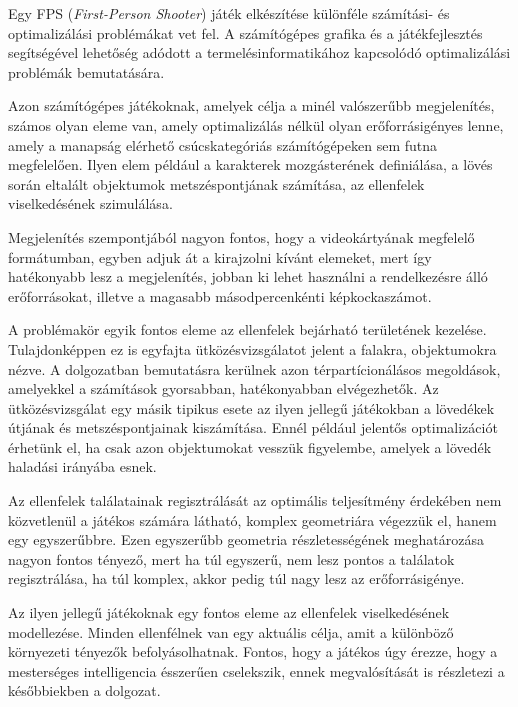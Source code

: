 \label{Chap:bevezetes}

Egy FPS (\textit{First-Person Shooter}) játék elkészítése különféle számítási- és optimalizálási problémákat vet fel. A számítógépes grafika és a játékfejlesztés segítségével lehetőség adódott a termelésinformatikához kapcsolódó optimalizálási problémák bemutatására.

Azon számítógépes játékoknak, amelyek célja a minél valószerűbb megjelenítés, számos olyan eleme van, amely optimalizálás nélkül olyan erőforrásigényes lenne, amely a manapság elérhető csúcskategóriás számítógépeken sem futna megfelelően. Ilyen elem például a karakterek mozgásterének definiálása, a lövés során eltalált objektumok metszéspontjának számítása, az ellenfelek viselkedésének szimulálása.

Megjelenítés szempontjából nagyon fontos, hogy a videokártyának megfelelő formátumban, egyben adjuk át a kirajzolni kívánt elemeket, mert így hatékonyabb lesz a megjelenítés, jobban ki lehet használni a rendelkezésre álló erőforrásokat, illetve a magasabb másodpercenkénti képkockaszámot.

A problémakör egyik fontos eleme az ellenfelek bejárható területének kezelése. Tulajdonképpen ez is egyfajta ütközésvizsgálatot jelent a falakra, objektumokra nézve. A dolgozatban bemutatásra kerülnek azon térpartícionálásos megoldások, amelyekkel a számítások gyorsabban, hatékonyabban elvégezhetők. Az ütközésvizsgálat egy másik tipikus esete az ilyen jellegű játékokban a lövedékek útjának és metszéspontjainak kiszámítása. Ennél például jelentős optimalizációt érhetünk el, ha csak azon objektumokat vesszük figyelembe, amelyek a lövedék haladási irányába esnek.

Az ellenfelek találatainak regisztrálását az optimális teljesítmény érdekében nem közvetlenül a játékos számára látható, komplex geometriára végezzük el, hanem egy egyszerűbbre. Ezen egyszerűbb geometria részletességének meghatározása nagyon fontos tényező, mert ha túl egyszerű, nem lesz pontos a találatok regisztrálása, ha túl komplex, akkor pedig túl nagy lesz az erőforrásigénye.

Az ilyen jellegű játékoknak egy fontos eleme az ellenfelek viselkedésének modellezése. Minden ellenfélnek van egy aktuális célja, amit a különböző környezeti tényezők befolyásolhatnak. Fontos, hogy a játékos úgy érezze, hogy a mesterséges intelligencia ésszerűen cselekszik, ennek megvalósítását is részletezi a későbbiekben a dolgozat.
